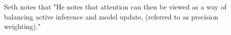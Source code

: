 Seth notes that "He notes that attention can then be viewed as a way of balancing active inference and model update, (referred to as precision weighting)."
























\section{}








